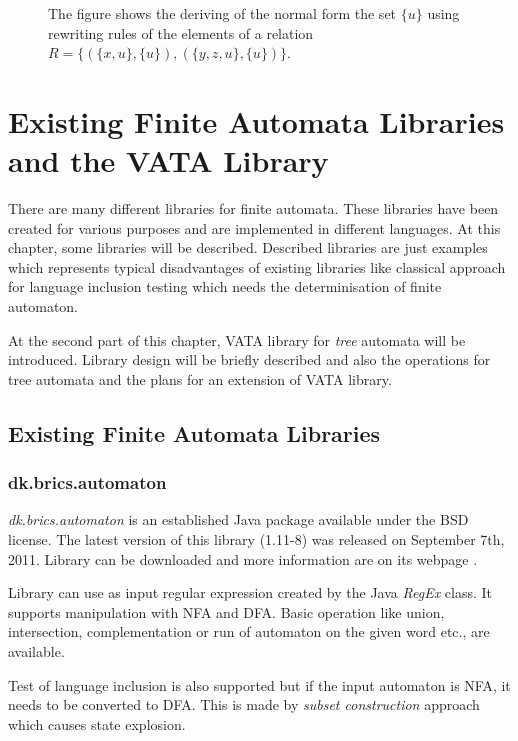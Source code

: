 \begin{figure}[bt]
  \begin{center}
    
    \label{figHKCRewO}
    \caption{The figure shows the deriving of the normal form the set $\{u\}$ using rewriting
      rules of the elements of a relation $R=\{(\{x,u\},\{u\}),(\{y,z,u\},\{u\})\}$.}
  \end{center}
\end{figure}

\chapter{Existing Finite Automata Libraries and the VATA Library} 
\label{libraries}
There are many different libraries for finite automata. These libraries have been created for various purposes and 
are implemented in different languages. 
At this chapter, some libraries will be described. Described libraries are just examples which represents typical disadvantages of existing libraries like
classical approach for language inclusion testing which needs the determinisation of finite automaton. 

At the second part of this chapter, VATA library for \emph{tree} automata will be introduced. 
Library design will be briefly described and also the operations for tree
automata and the plans for an extension of VATA library.

\section{Existing Finite Automata Libraries}
\label{existinglibraries}
\subsection{dk.brics.automaton}
\label{brics}
\emph{dk.brics.automaton} is an established Java package available under the BSD license. The latest version of this library (1.11-8) 
was released on September 7th, 2011.
Library can be downloaded and more information are on its webpage \cite{brics}. 

Library can use as input regular expression created by the Java \emph{RegEx} class.
It supports manipulation with NFA and DFA. Basic operation like union,
intersection, complementation or run of automaton on the given word etc., are available.

Test of language inclusion is also supported but if the input automaton is NFA, it needs to be converted to DFA. 
This is made by \emph{subset construction} approach which causes state explosion.

